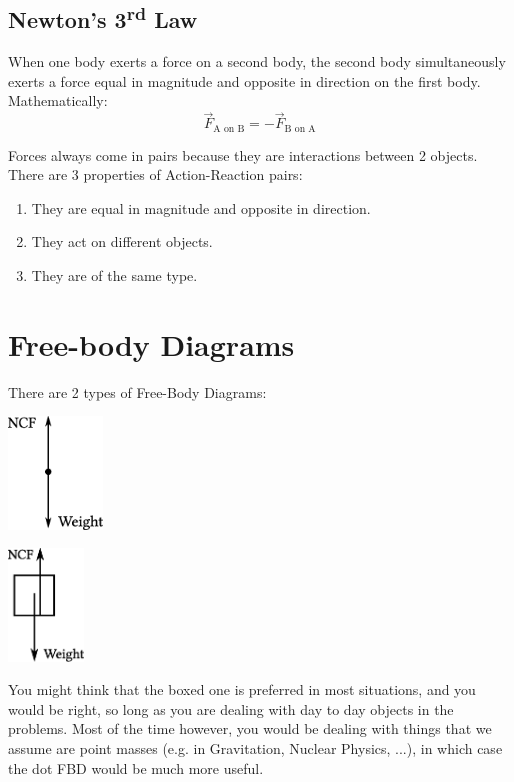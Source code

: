 \documentclass[11pt]{article}
\numberwithin{equation}{section}
\newenvironment{multicolFigure}
{\par\medskip\noindent\minipage{\linewidth}}
{\endminipage\par\medskip}
\begin{document}
		\subsection{Newton's 3\textsuperscript{rd} Law}
		\begin{shaded}
		 	When one body exerts a force on a second body, the second body simultaneously exerts a force equal in magnitude and opposite in direction on the first body. Mathematically: 
		 	\begin{equation}
			 	\vec{F}_{\text{A on B}} = -\vec{F}_{\text{B on A}}
		 	\end{equation}
		\end{shaded}
		Forces always come in pairs because they are interactions between 2 objects. There are 3 properties of Action-Reaction pairs:
		\begin{enumerate}
			\item They are equal in magnitude and opposite in direction.
			\item They act on different objects.
			\item They are of the same type. 
		\end{enumerate}
	
	\pagebreak
	\section{Free-body Diagrams}
	There are 2 types of Free-Body Diagrams: 
	\begin{multicols}{2}
		\begin{multicolFigure}
				\centering
				\includegraphics[height=3cm]{FBD_dot.eps}
		\end{multicolFigure}
		\begin{multicolFigure}
				\centering
				\includegraphics[height=3cm]{FBD_box.eps}
		\end{multicolFigure}
	\end{multicols}
	You might think that the boxed one is preferred in most situations, and you would be right, so long as you are dealing with day to day objects in the problems. Most of the time however, you would be dealing with things that we assume are point masses (e.g. in Gravitation, Nuclear Physics, ...), in which case the dot FBD would be much more useful. 
	
\end{document}
